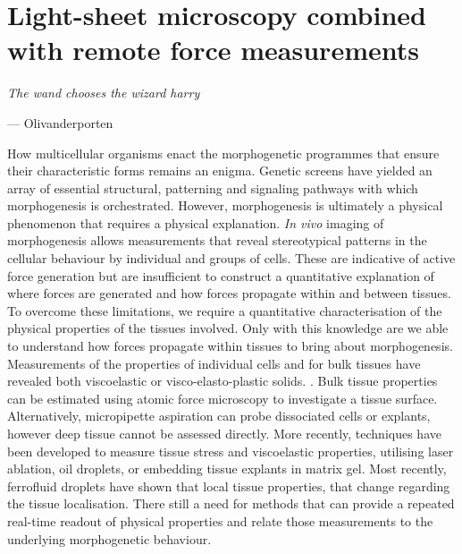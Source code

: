 \ifpdf
    \graphicspath{{Chapter/tweezers/Figs/Raster/}{Chapter/tweezers/Figs/PDF/}{Chapter/tweezers/Figs/}}
\else
    \graphicspath{{Chapter/tweezers/Figs/Vector/}{Chapter/tweezers/Figs/}}
\fi

\chapter[Light-sheet microscopy combined with remote force measurements]{Light-sheet microscopy combined with remote force measurements}%
\epigraph{\textit{The wand chooses the wizard harry}}{--- Olivanderporten}
How multicellular organisms enact the morphogenetic programmes that ensure their characteristic forms remains an enigma.
Genetic screens have yielded an array of essential structural, patterning and signaling pathways with which morphogenesis is orchestrated. \cite{?}
However, morphogenesis is ultimately a physical phenomenon that requires a physical explanation.
\emph{In vivo} imaging of morphogenesis allows measurements that reveal stereotypical patterns in the cellular behaviour by individual and groups of cells.
These are indicative of active force generation but are insufficient to construct a quantitative explanation of where forces are generated and how forces propagate within and between tissues.
To overcome these limitations, we require a quantitative characterisation of the physical properties of the tissues involved.
Only with this knowledge are we able to understand how forces propagate within tissues to bring about morphogenesis.
Measurements of the properties of individual cells \cite{?}
and for bulk tissues \cite{?}
have revealed both viscoelastic or visco-elasto-plastic solids. \cite{?}.
Bulk tissue properties can be estimated using atomic force microscopy to investigate a tissue surface. \cite{?}
Alternatively, micropipette aspiration can probe dissociated cells or explants, however deep tissue cannot be assessed directly. \cite{?}
More recently, techniques have been developed to measure tissue stress and viscoelastic properties, utilising laser ablation, oil droplets, or embedding tissue explants in matrix gel.
Most recently, ferrofluid droplets have shown that local tissue properties, that change regarding the tissue localisation. \cite{?}
There still a need for methods that can provide a repeated real-time readout of physical properties and relate those measurements to the underlying morphogenetic behaviour.

